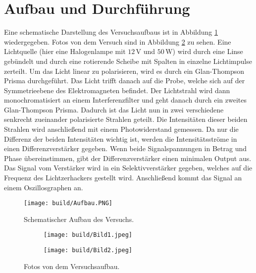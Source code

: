 \section{Aufbau und Durchführung}
\label{sec:Durchführung}

Eine schematische Darstellung des Versuchsaufbaus ist in Abbildung \ref{fig:aufbau} wiedergegeben. Fotos von dem Versuch sind in Abbildung \ref{fig:fotos} zu sehen. 
Eine Lichtquelle (hier eine Halogenlampe mit $12\,\si{\volt}$ und $50 \,\si{\watt}$) wird durch eine Linse gebündelt und durch eine rotierende Scheibe mit Spalten in einzelne Lichtimpulse zerteilt. 
Um das Licht linear zu polarisieren, wird es durch ein Glan-Thompson Prisma durchgeführt. Das Licht trifft danach auf die Probe, welche sich auf der Symmetrieebene 
des Elektromagneten befindet. Der Lichtstrahl wird dann monochromatisiert an einem Interferenzfilter und geht danach durch ein zweites Glan-Thompson Prisma. Dadurch ist das Licht nun in zwei verschiedene senkrecht zueinander polarisierte Strahlen geteilt. 
Die Intensitäten dieser beiden Strahlen wird anschließend mit einem Photowiderstand gemessen. Da nur die Differenz der beiden Intensitäten wichtig ist, 
werden die Intensitätsströme in einen Differenzverstärker gegeben. Wenn beide Signalspannungen in Betrag und Phase übereinstimmen, gibt der Differenzverstärker einen minimalen Output aus. 
Das Signal vom Verstärker wird in ein Selektivverstärker gegeben, welches auf die Frequenz des Lichtzerhackers gestellt wird. Anschließend kommt das Signal an einem Oszillosgraphen an.\\

\begin{figure}[H]
    \centering
    \texttt{[image: build/Aufbau.PNG]}
    \caption{Schematischer Aufbau des Versuchs. \cite{Anleitung}}
    \label{fig:aufbau}
\end{figure}
\begin{figure}
    \centering
    \begin{subfigure}{.4\textwidth}
        \centering
        \texttt{[image: build/Bild1.jpeg]}
    \end{subfigure}
    \begin{subfigure}{.4\textwidth}
        \centering
        \texttt{[image: build/Bild2.jpeg]}
    \end{subfigure}
    \caption{Fotos von dem Versuchsaufbau.}
    \label{fig:fotos}
\end{figure}

